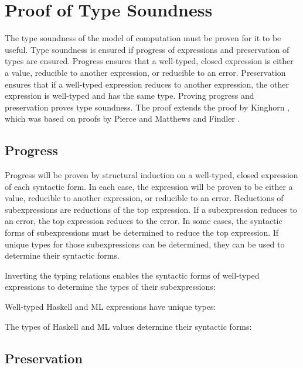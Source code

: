 \chapter{Proof of Type Soundness}

The type soundness of the model of computation must be proven for it to be useful.  Type soundness is ensured if progress of expressions and preservation of types are ensured.  Progress ensures that a well-typed, closed expression is either a value, reducible to another expression, or reducible to an error.  Preservation ensures that if a well-typed expression reduces to another expression, the other expression is well-typed and has the same type.  Proving progress and preservation proves type soundness.  The proof extends the proof by Kinghorn \cite{kinghorn07}, which was based on proofs by Pierce \cite{pierce02} and Matthews and Findler \cite{matthews07}.

\section{Progress}

Progress will be proven by structural induction on a well-typed, closed expression of each syntactic form.  In each case, the expression will be proven to be either a value, reducible to another expression, or reducible to an error.  Reductions of subexpressions are reductions of the top expression.  If a subexpression reduces to an error, the top expression reduces to the error.  In some cases, the syntactic forms of subexpressions must be determined to reduce the top expression.  If unique types for those subexpressions can be determined, they can be used to determine their syntactic forms.

Inverting the typing relations enables the syntactic forms of well-typed expressions to determine the types of their subexpressions:



Well-typed Haskell and ML expressions have unique types:



The types of Haskell and ML values determine their syntactic forms:




\section{Preservation}

